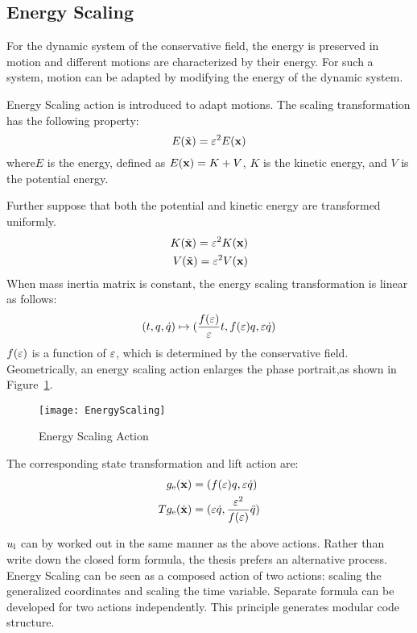 \subsection*{Energy Scaling}
For the  dynamic system of the conservative field,
the energy is preserved in motion and different motions are characterized by their energy.
For such a system, motion can be adapted by modifying the energy of the dynamic system.

Energy Scaling action is introduced to adapt motions.
The scaling transformation has the following property:
\[
E(\tilde{\mathbf{x}})=\varepsilon^2 E(\mathbf{x})
\]
where$E$ is the energy, defined as $E(\mathbf{x})=K+V$,  $K$ is the kinetic energy, and $V$ is the potential energy.

Further suppose that both the potential and kinetic energy are transformed uniformly.
\begin{align}
K(\tilde{\mathbf{x}})=\varepsilon^2 K(\mathbf{x}) \nonumber\\
V(\tilde{\mathbf{x}})=\varepsilon^2 V(\mathbf{x}) \nonumber
\end{align}
When mass inertia matrix is constant,  the energy scaling transformation is linear as follows:
\[
(t,q,\dot{q} ) \mapsto ( \frac{f(\varepsilon)}{\varepsilon}t ,f(\varepsilon)q,\varepsilon\dot{q})
\]
$f(\varepsilon)$ is a function of $\varepsilon$, which is determined by the conservative field.
Geometrically, an energy scaling action enlarges the phase portrait,as shown in Figure~\ref{fig:gen}.
\begin{figure}[!htbp]
  \begin{center}
      \texttt{[image: EnergyScaling]}
    \caption{Energy Scaling Action}
    \label{fig:gen}
\end{center}
\end{figure}

The corresponding  state transformation and lift action are:
\begin{align}
g_{\mathrm{e}}(\mathbf{x})&=(f(\varepsilon) q,\varepsilon \dot{q}) \nonumber\\
Tg_{\mathrm{e}}(\dot{\mathbf{x}})&=(\varepsilon \dot{q},\frac{\varepsilon^2}{f(\varepsilon)}\ddot{q})
\end{align}

$u_{\mathrm{l}}$ can by worked out in the same manner as the above actions.
Rather than write down the closed form formula, the thesis prefers an alternative process.
Energy Scaling can be seen as a composed action of two actions: scaling the generalized coordinates and scaling the time variable.
Separate formula can be developed for two actions independently.
This principle generates modular code structure.




